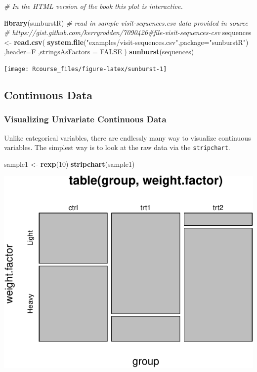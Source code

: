 \documentclass[]{book}
\newenvironment{Shaded}{\begin{snugshade}}{\end{snugshade}}
\newcommand{\KeywordTok}[1]{\textcolor[rgb]{0.13,0.29,0.53}{\textbf{#1}}}
\newcommand{\DataTypeTok}[1]{\textcolor[rgb]{0.13,0.29,0.53}{#1}}
\newcommand{\DecValTok}[1]{\textcolor[rgb]{0.00,0.00,0.81}{#1}}
\newcommand{\StringTok}[1]{\textcolor[rgb]{0.31,0.60,0.02}{#1}}
\newcommand{\CommentTok}[1]{\textcolor[rgb]{0.56,0.35,0.01}{\textit{#1}}}
\newcommand{\OtherTok}[1]{\textcolor[rgb]{0.56,0.35,0.01}{#1}}
\newcommand{\NormalTok}[1]{#1}
\theoremstyle{definition}
\theoremstyle{definition}
\theoremstyle{definition}
\theoremstyle{remark}
\begin{document}
\begin{Shaded}
\begin{Highlighting}[]
\CommentTok{# In the HTML version of the book this plot is interactive.}

\KeywordTok{library}\NormalTok{(sunburstR)}
\CommentTok{# read in sample visit-sequences.csv data provided in source}
\CommentTok{# https://gist.github.com/kerryrodden/7090426#file-visit-sequences-csv}
\NormalTok{sequences <-}\StringTok{ }\KeywordTok{read.csv}\NormalTok{(}
  \KeywordTok{system.file}\NormalTok{(}\StringTok{"examples/visit-sequences.csv"}\NormalTok{,}\DataTypeTok{package=}\StringTok{"sunburstR"}\NormalTok{)}
\NormalTok{  ,}\DataTypeTok{header=}\NormalTok{F}
\NormalTok{  ,}\DataTypeTok{stringsAsFactors =} \OtherTok{FALSE}
\NormalTok{)}
\KeywordTok{sunburst}\NormalTok{(sequences)}
\end{Highlighting}
\end{Shaded}

\texttt{[image: Rcourse\_files/figure-latex/sunburst-1]}

\subsection{Continuous Data}\label{continuous-data}

\subsubsection{Visualizing Univariate Continuous
Data}\label{visualizing-univariate-continuous-data}

Unlike categorical variables, there are endlessly many way to visualize
continuous variables. The simplest way is to look at the raw data via
the \texttt{stripchart}.

\begin{Shaded}
\begin{Highlighting}[]
\NormalTok{sample1 <-}\StringTok{ }\KeywordTok{rexp}\NormalTok{(}\DecValTok{10}\NormalTok{)                             }
\KeywordTok{stripchart}\NormalTok{(sample1)}
\end{Highlighting}
\end{Shaded}

\includegraphics[width=0.5\linewidth]{Rcourse_files/figure-latex/unnamed-chunk-132-1}
\end{document}
